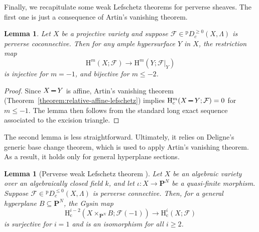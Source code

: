 \documentclass[english]{smfart}
\renewcommand{\setminus}{\mathbin{\rule[0.2em]{0.67em}{0.12em}}}%
\renewcommand{\leq}{\leqslant}
\renewcommand{\geq}{\geqslant}
\renewcommand{\subset}{\subseteq}
\theoremstyle{remark}
\theoremstyle{plain}
\newtheorem{lemma}[remark]{Lemma}
\theoremstyle{definition}
\numberwithin{equation}{remark}
\theoremstyle{void}
\begin{document}
Finally, we recapitulate some weak Lefschetz theorems for
perverse sheaves.  The first one is just a consequence of Artin's vanishing theorem.


\begin{lemma}\label{lemma:weak-lefschetz}
Let \(X\) be a projective variety and suppose
\(\mathcal{F} \in {}^{\mathrm{p}}D_c^{\geq0}(X,\Lambda)\) is perverse
coconnective.  Then for any ample hypersurface \(Y\) in \(X\), the
restriction map
\[
\mathrm{H}^{m}(X;\mathcal{F}) \to \mathrm{H}^{m}(Y;\mathcal{F}|_{Y})
\]
is injective for \(m = -1\), and bijective for \(m \leq -2\).
\end{lemma}

\begin{proof}
Since \(X\setminus Y\) is affine, Artin's vanishing theorem
(Theorem~\ref{theorem:relative-affine-lefschetz}) implies
\(\mathrm{H}^{m}_{c}(X\setminus Y; \mathcal{F}) = 0\) for
\(m \leq -1\).  The lemma then follows from the standard long exact
sequence associated to the excision triangle.
\end{proof}

The second lemma is less straightforward.  Ultimately, it relies on
Deligne's generic base change theorem, which is used to apply
Artin's vanishing theorem.  As a result, it holds only for general
hyperplane sections.

\begin{lemma}[Perverse weak Lefschetz theorem {\cite[Lemma~3.8]{wan-zhang_colevel}}]
\label{lemma:gysin}
Let \(X\) be an algebraic variety over an algebraically closed field
\(k\), and let \(\iota \colon X \to \mathbf{P}^{N}\) be a quasi-finite
morphism.  Suppose
\(\mathcal{F} \in {}^{\mathrm{p}}D^{\leq0}_{c}(X,\Lambda)\) is
perverse connective.  Then, for a general hyperplane
\(B \subset \mathbf{P}^{N}\), the Gysin map
\[
\mathrm{H}^{i-2}_{\mathrm{c}}
\left(X \times_{\mathbf{P}^{N}} B; \mathcal{F}(-1)\right)
\longrightarrow
\mathrm{H}^{i}_{\mathrm{c}}(X; \mathcal{F})
\]
is surjective for \(i = 1\) and is an isomorphism for all \(i \geq 2\).
\end{lemma}
\end{document}
